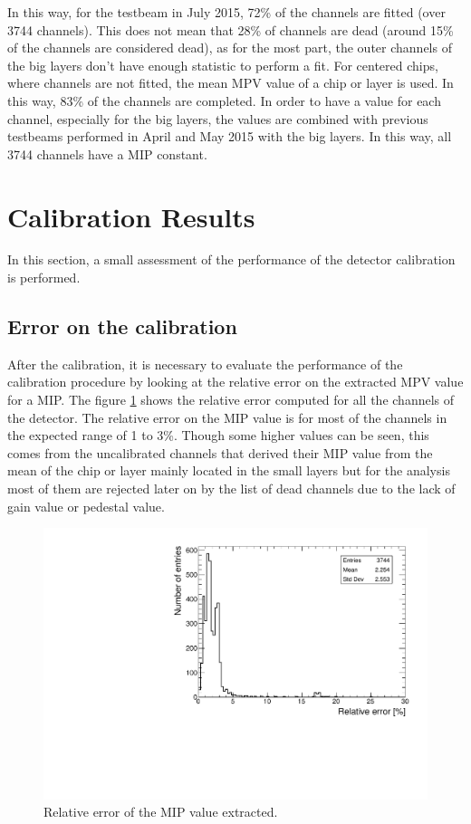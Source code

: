 In this way, for the testbeam in July 2015, 72\% of the channels are fitted (over 3744 channels). This does not mean that 28\% of channels are dead (around 15\% of the channels are considered dead), as for the most part, the outer channels of the big layers don't have enough statistic to perform a fit. For centered chips, where channels are not fitted, the mean MPV value of a chip or layer is used. In this way, 83\% of the channels are completed. In order to have a value for each channel, especially for the big layers, the values are combined with previous testbeams performed in April and May 2015 with the big layers. In this way, all 3744 channels have a MIP constant.

\section{Calibration Results}

In this section, a small assessment of the performance of the detector calibration is performed.

\subsection{Error on the calibration}

After the calibration, it is necessary to evaluate the performance of the calibration procedure by looking at the relative error on the extracted MPV value for a MIP. The figure \ref{fig:MIPError} shows the relative error computed for all the channels of the detector. The relative error on the MIP value is for most of the channels in the expected range of 1 to 3\%. Though some higher values can be seen, this comes from the uncalibrated channels that derived their MIP value from the mean of the chip or layer mainly located in the small layers but for the analysis most of them are rejected later on by the list of dead channels due to the lack of gain value or pedestal value.

\begin{figure}[htbp!]
	\centering
	\includegraphics[width=0.7\linewidth]{../Thesis_Plots/EnergyCalib/Plots/RelativeErrorMIP_Combined.pdf}
	\caption{Relative error of the MIP value extracted.} \label{fig:MIPError}
\end{figure}

